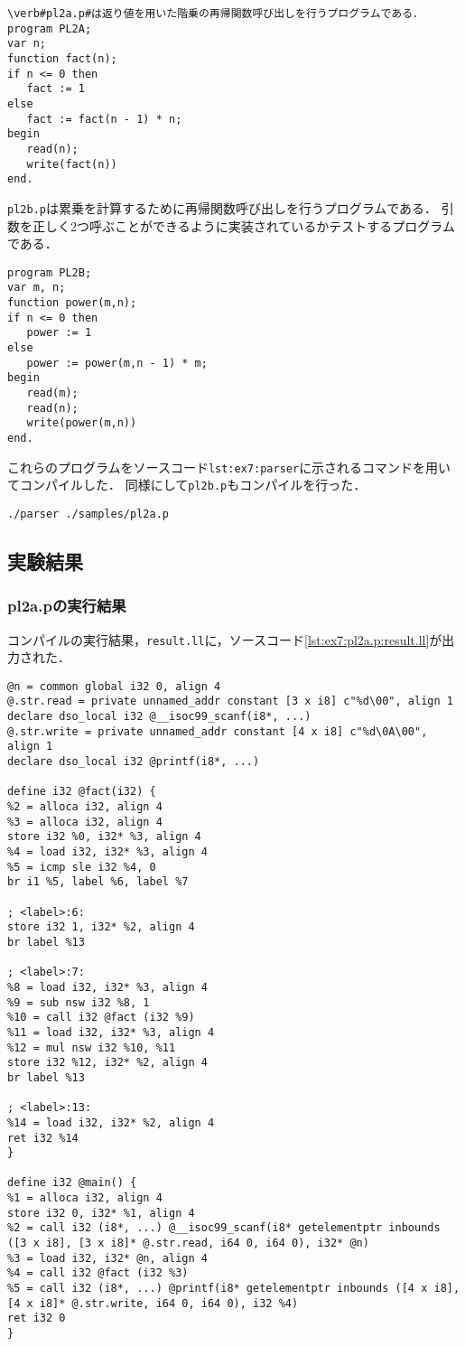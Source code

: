 \documentclass[uplatex]{jsarticle}
\begin{document}
\begin{lstlisting}[caption=pl2a.p,label=lst:ex7:pl2a.p]
\verb#pl2a.p#は返り値を用いた階乗の再帰関数呼び出しを行うプログラムである．
program PL2A;
var n;
function fact(n);
if n <= 0 then
   fact := 1
else
   fact := fact(n - 1) * n;
begin
   read(n);
   write(fact(n))
end.
\end{lstlisting}

\verb#pl2b.p#は累乗を計算するために再帰関数呼び出しを行うプログラムである．
引数を正しく2つ呼ぶことができるように実装されているかテストするプログラムである．
\begin{lstlisting}[caption=pl2b.p,label=lst:ex7:pl2b.p]
program PL2B;
var m, n;
function power(m,n);
if n <= 0 then
   power := 1
else
   power := power(m,n - 1) * m;
begin
   read(m);
   read(n);
   write(power(m,n))
end.
\end{lstlisting}

これらのプログラムをソースコード\verb#lst:ex7:parser#に示されるコマンドを用いてコンパイルした．
同様にして\verb#pl2b.p#もコンパイルを行った．
\begin{lstlisting}[caption=parserコマンド,label=lst:ex6:parser]
./parser ./samples/pl2a.p
\end{lstlisting}

\subsection{実験結果}
\subsubsection{pl2a.pの実行結果}
コンパイルの実行結果，\verb#result.ll#に，ソースコード\ref{lst:ex7:pl2a.p:result.ll}が出力された．
\begin{lstlisting}[caption=result.ll,label=lst:ex7:pl2a.p:result.ll]
@n = common global i32 0, align 4
@.str.read = private unnamed_addr constant [3 x i8] c"%d\00", align 1
declare dso_local i32 @__isoc99_scanf(i8*, ...)
@.str.write = private unnamed_addr constant [4 x i8] c"%d\0A\00", align 1
declare dso_local i32 @printf(i8*, ...)

define i32 @fact(i32) {
%2 = alloca i32, align 4
%3 = alloca i32, align 4
store i32 %0, i32* %3, align 4
%4 = load i32, i32* %3, align 4
%5 = icmp sle i32 %4, 0
br i1 %5, label %6, label %7

; <label>:6:
store i32 1, i32* %2, align 4
br label %13

; <label>:7:
%8 = load i32, i32* %3, align 4
%9 = sub nsw i32 %8, 1
%10 = call i32 @fact (i32 %9)
%11 = load i32, i32* %3, align 4
%12 = mul nsw i32 %10, %11
store i32 %12, i32* %2, align 4
br label %13

; <label>:13:
%14 = load i32, i32* %2, align 4
ret i32 %14
}

define i32 @main() {
%1 = alloca i32, align 4
store i32 0, i32* %1, align 4
%2 = call i32 (i8*, ...) @__isoc99_scanf(i8* getelementptr inbounds ([3 x i8], [3 x i8]* @.str.read, i64 0, i64 0), i32* @n)
%3 = load i32, i32* @n, align 4
%4 = call i32 @fact (i32 %3)
%5 = call i32 (i8*, ...) @printf(i8* getelementptr inbounds ([4 x i8], [4 x i8]* @.str.write, i64 0, i64 0), i32 %4)
ret i32 0
}
\end{lstlisting}
\end{document}
